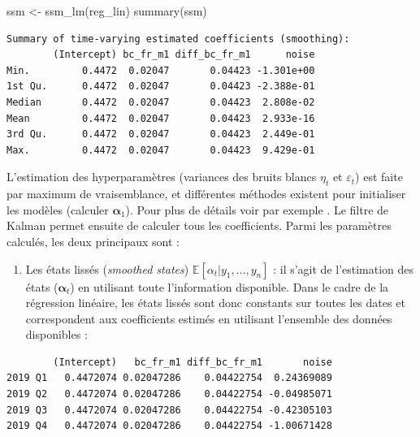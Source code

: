 \documentclass[
  a4paper,
  DIV=11,
  numbers=noendperiod,
  french]{scrartcl}
\newenvironment{Shaded}{\begin{snugshade}}{\end{snugshade}}
\newcommand{\AttributeTok}[1]{\textcolor[rgb]{0.40,0.45,0.13}{#1}}
\newcommand{\DecValTok}[1]{\textcolor[rgb]{0.68,0.00,0.00}{#1}}
\newcommand{\FunctionTok}[1]{\textcolor[rgb]{0.28,0.35,0.67}{#1}}
\newcommand{\NormalTok}[1]{\textcolor[rgb]{0.00,0.23,0.31}{#1}}
\newcommand{\OtherTok}[1]{\textcolor[rgb]{0.00,0.23,0.31}{#1}}
\newcommand{\SpecialCharTok}[1]{\textcolor[rgb]{0.37,0.37,0.37}{#1}}
\providecommand{\tightlist}{%
  \setlength{\itemsep}{0pt}\setlength{\parskip}{0pt}}\usepackage{longtable,booktabs,array}
\newcommand\1{{\mathds 1}}
\newcommand{\bf}[1]{{\boldsymbol #1}}
\newcommand{\E}[1]{\mathbb{E}\left[#1\right]}
\theoremstyle{remark}
\begin{document}
\begin{Shaded}
\begin{Highlighting}[]
\NormalTok{ssm }\OtherTok{\textless{}{-}} \FunctionTok{ssm\_lm}\NormalTok{(reg\_lin)}
\FunctionTok{summary}\NormalTok{(ssm)}
\end{Highlighting}
\end{Shaded}

\begin{verbatim}
Summary of time-varying estimated coefficients (smoothing): 
        (Intercept) bc_fr_m1 diff_bc_fr_m1      noise
Min.         0.4472  0.02047       0.04423 -1.301e+00
1st Qu.      0.4472  0.02047       0.04423 -2.388e-01
Median       0.4472  0.02047       0.04423  2.808e-02
Mean         0.4472  0.02047       0.04423  2.933e-16
3rd Qu.      0.4472  0.02047       0.04423  2.449e-01
Max.         0.4472  0.02047       0.04423  9.429e-01
\end{verbatim}

L'estimation des hyperparamètres (variances des bruits blancs \(\eta_t\)
et \(\varepsilon_t\)) est faite par maximum de vraisemblance, et
différentes méthodes existent pour initialiser les modèles (calculer
\(\bf \alpha_1\)). Pour plus de détails voir par exemple
\textcite{durbinkoopman}. Le filtre de Kalman permet ensuite de calculer
tous les coefficients. Parmi les paramètres calculés, les deux
principaux sont :

\begin{enumerate}
\def\labelenumi{\arabic{enumi}.}
\tightlist
\item
  Les états lissés (\emph{smoothed states})
  \(\E{\alpha_t|y_1,\dots,y_n}\) : il s'agit de l'estimation des états
  (\(\bf\alpha_t\)) en utilisant toute l'information disponible. Dans le
  cadre de la régression linéaire, les états lissés sont donc constants
  sur toutes les dates et correspondent aux coefficients estimés en
  utilisant l'ensemble des données disponibles :
\end{enumerate}

\begin{Shaded}
\end{Shaded}

\begin{verbatim}
        (Intercept)   bc_fr_m1 diff_bc_fr_m1       noise
2019 Q1   0.4472074 0.02047286    0.04422754  0.24369089
2019 Q2   0.4472074 0.02047286    0.04422754 -0.04985071
2019 Q3   0.4472074 0.02047286    0.04422754 -0.42305103
2019 Q4   0.4472074 0.02047286    0.04422754 -1.00671428
\end{verbatim}
\end{document}
